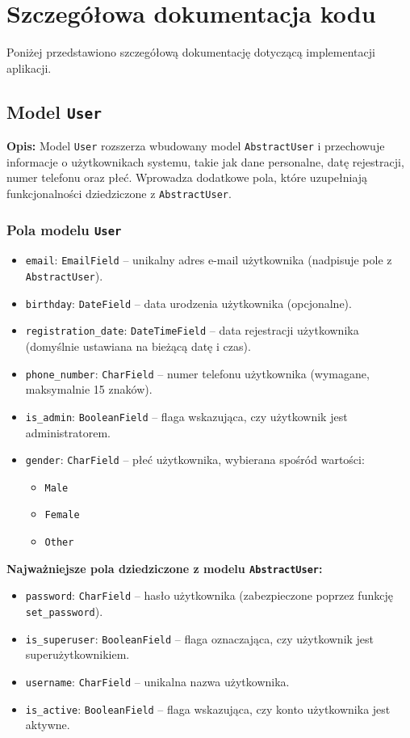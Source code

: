\documentclass[12pt,a4paper,oneside]{article}
\theoremstyle{definition}
\numberwithin{equation}{section}
\begin{document}
\clearpage

\section{Szczegółowa dokumentacja kodu}
Poniżej przedstawiono szczegółową dokumentację dotyczącą implementacji aplikacji.
%
%
\subsection{Model \texttt{User}}
\textbf{Opis:} 
Model \texttt{User} rozszerza wbudowany model \texttt{AbstractUser} i przechowuje informacje o użytkownikach systemu, takie jak dane personalne, datę rejestracji, numer telefonu oraz płeć. Wprowadza dodatkowe pola, które uzupełniają funkcjonalności dziedziczone z \texttt{AbstractUser}.

\subsubsection{Pola modelu \texttt{User}}
\begin{itemize}
    \item \texttt{email}: \texttt{EmailField} – unikalny adres e-mail użytkownika (nadpisuje pole z \texttt{AbstractUser}).
    \item \texttt{birthday}: \texttt{DateField} – data urodzenia użytkownika (opcjonalne).
    \item \texttt{registration\_date}: \texttt{DateTimeField} – data rejestracji użytkownika (domyślnie ustawiana na bieżącą datę i czas).
    \item \texttt{phone\_number}: \texttt{CharField} – numer telefonu użytkownika (wymagane, maksymalnie 15 znaków).
    \item \texttt{is\_admin}: \texttt{BooleanField} – flaga wskazująca, czy użytkownik jest administratorem.
    \item \texttt{gender}: \texttt{CharField} – płeć użytkownika, wybierana spośród wartości:
    \begin{itemize}
        \item \texttt{Male}
        \item \texttt{Female}
        \item \texttt{Other}
    \end{itemize}
\end{itemize}

\textbf{Najważniejsze pola dziedziczone z modelu \texttt{AbstractUser}:}
\begin{itemize}
    \item \texttt{password}: \texttt{CharField} – hasło użytkownika (zabezpieczone poprzez funkcję \texttt{set\_password}).
    \item \texttt{is\_superuser}: \texttt{BooleanField} – flaga oznaczająca, czy użytkownik jest superużytkownikiem.
    \item \texttt{username}: \texttt{CharField} – unikalna nazwa użytkownika.
    \item \texttt{is\_active}: \texttt{BooleanField} – flaga wskazująca, czy konto użytkownika jest aktywne.
\end{itemize}
\end{document}
